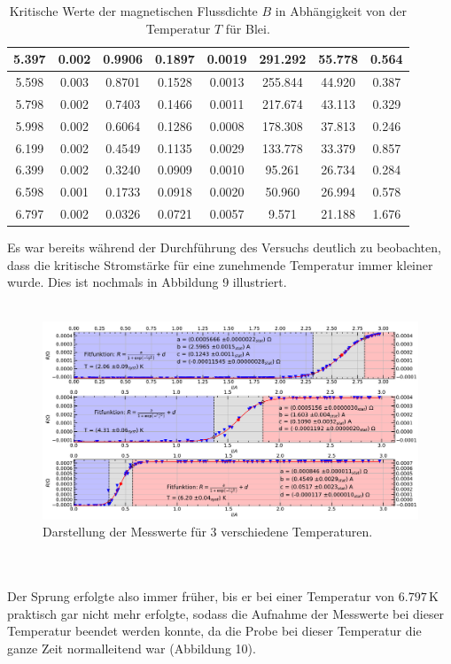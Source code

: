 \documentclass[german,  %
parskip=full,  %
]{scrartcl}
\begin{document}
\begin{table} [h!]
\begin{tabular}{|c|c|c|c|c|c|c|c|}
5.397 & 0.002 & 0.9906 & 0.1897 & 0.0019 & 291.292 & 55.778 & 0.564\\\hline
5.598 & 0.003 & 0.8701 & 0.1528 & 0.0013 & 255.844 & 44.920 & 0.387\\\hline
5.798 & 0.002 & 0.7403 & 0.1466 & 0.0011 & 217.674 & 43.113 & 0.329\\\hline
5.998 & 0.002 & 0.6064 & 0.1286 & 0.0008 & 178.308 & 37.813 & 0.246\\\hline
6.199 & 0.002 & 0.4549 & 0.1135 & 0.0029 & 133.778 & 33.379 & 0.857\\\hline
6.399 & 0.002 & 0.3240 & 0.0909 & 0.0010 & 95.261 & 26.734 & 0.284\\\hline
6.598 & 0.001 & 0.1733 & 0.0918 & 0.0020 & 50.960 & 26.994 & 0.578\\\hline
6.797 & 0.002 & 0.0326 & 0.0721 & 0.0057 & 9.571 & 21.188 & 1.676\\\hline
\end{tabular}
\caption{Kritische Werte der magnetischen Flussdichte \(B\) in Abhängigkeit von der Temperatur \(T\) für Blei.}
\label{t} 
\end{table}
\newpage
Es war bereits während der Durchführung des Versuchs deutlich zu beobachten, dass die kritische Stromstärke für eine zunehmende Temperatur immer kleiner wurde. Dies ist nochmals in Abbildung 9 illustriert.
\\\\
\begin{figure}[h!]
\centering
\includegraphics[width=\textwidth]{verschiedene_Temperaturen}
\caption{Darstellung der Messwerte für 3 verschiedene Temperaturen.}
\end{figure}
\\\\
Der Sprung erfolgte also immer früher, bis er bei einer Temperatur von $6.797$\,K praktisch gar nicht mehr erfolgte, sodass die Aufnahme der Messwerte bei dieser Temperatur beendet werden konnte, da die Probe bei dieser Temperatur die ganze Zeit normalleitend war (Abbildung 10).
\end{document}
